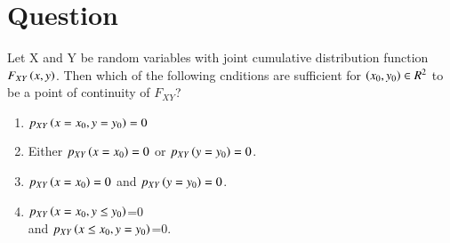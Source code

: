 \documentclass[journal,12pt,twocolumn]{IEEEtran}
\begin{document}
\section{Question}
Let X and Y be random variables with joint cumulative distribution function $F_{XY}\left(x,y\right)$. Then which of the following cnditions are sufficient for $\left(x_0,y_0\right) \in R^2$ to be a point of continuity of $F_{XY}$?
\begin{enumerate}
\item $p_{XY}\left(x=x_0,y=y_0\right)=0$
\item Either $p_{XY}\left(x=x_0\right)=0$ or $p_{XY}\left(y=y_0\right)=0$.
\item $p_{XY}\left(x=x_0\right)=0$ and $p_{XY}\left(y=y_0\right)=0$.
\item $p_{XY}\left(x=x_0,y\leq y_0\right)$=0\\
 and $p_{XY}\left(x\leq x_0,y=y_0\right)$=0.
\end{enumerate}
\end{document}
